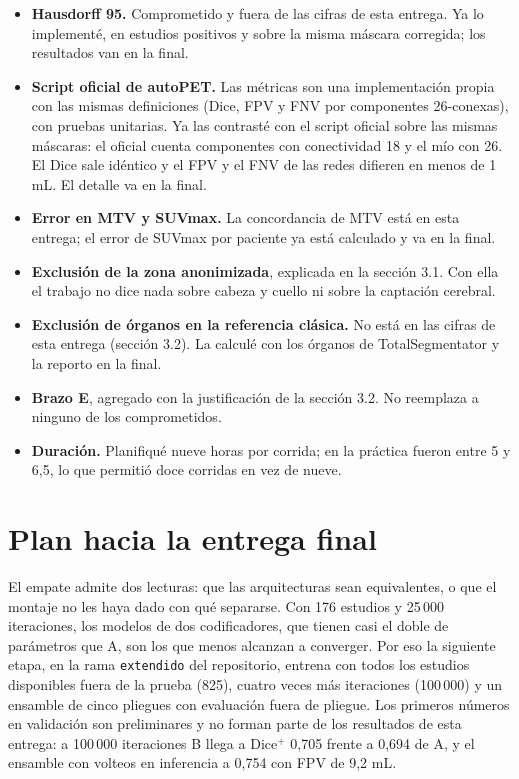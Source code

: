 \documentclass[11pt,a4paper]{article}
\begin{document}
\begin{itemize}
\item \textbf{Hausdorff 95.} Comprometido y fuera de las cifras de esta entrega. Ya lo implementé, en estudios positivos y sobre la misma máscara corregida; los resultados van en la final.
\item \textbf{Script oficial de autoPET.} Las métricas son una implementación propia con las mismas definiciones (Dice, FPV y FNV por componentes 26-conexas), con pruebas unitarias. Ya las contrasté con el script oficial sobre las mismas máscaras: el oficial cuenta componentes con conectividad 18 y el mío con 26. El Dice sale idéntico y el FPV y el FNV de las redes difieren en menos de 1 mL. El detalle va en la final.
\item \textbf{Error en MTV y SUVmax.} La concordancia de MTV está en esta entrega; el error de SUVmax por paciente ya está calculado y va en la final.
\item \textbf{Exclusión de la zona anonimizada}, explicada en la sección 3.1. Con ella el trabajo no dice nada sobre cabeza y cuello ni sobre la captación cerebral.
\item \textbf{Exclusión de órganos en la referencia clásica.} No está en las cifras de esta entrega (sección 3.2). La calculé con los órganos de TotalSegmentator y la reporto en la final.
\item \textbf{Brazo E}, agregado con la justificación de la sección 3.2. No reemplaza a ninguno de los comprometidos.
\item \textbf{Duración.} Planifiqué nueve horas por corrida; en la práctica fueron entre 5 y 6,5, lo que permitió doce corridas en vez de nueve.
\end{itemize}

\section{Plan hacia la entrega final}

El empate admite dos lecturas: que las arquitecturas sean equivalentes, o que el montaje no les haya dado con qué separarse. Con 176 estudios y 25\,000 iteraciones, los modelos de dos codificadores, que tienen casi el doble de parámetros que A, son los que menos alcanzan a converger. Por eso la siguiente etapa, en la rama \texttt{extendido} del repositorio, entrena con todos los estudios disponibles fuera de la prueba (825), cuatro veces más iteraciones (100\,000) y un ensamble de cinco pliegues con evaluación fuera de pliegue. Los primeros números en validación son preliminares y no forman parte de los resultados de esta entrega: a 100\,000 iteraciones B llega a Dice$^+$ 0,705 frente a 0,694 de A, y el ensamble con volteos en inferencia a 0,754 con FPV de 9,2 mL.
\end{document}
